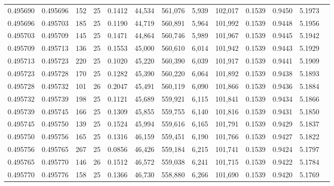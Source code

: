 \begin{tabular}{rrrrrrrrrrrrr}
0.495690 & 0.495696 & 152 &  25 &                                     0.1412 &  44,534 & 561,076 &   5,939 & 102,017 & 0.1539 & 0.9450 & 5.1973 \\
0.495696 & 0.495703 & 185 &  25 &                                     0.1190 &  44,719 & 560,891 &   5,964 & 101,992 & 0.1539 & 0.9448 & 5.1956 \\
0.495703 & 0.495709 & 145 &  25 &                                     0.1471 &  44,864 & 560,746 &   5,989 & 101,967 & 0.1539 & 0.9445 & 5.1942 \\
0.495709 & 0.495713 & 136 &  25 &                                     0.1553 &  45,000 & 560,610 &   6,014 & 101,942 & 0.1539 & 0.9443 & 5.1929 \\
0.495713 & 0.495723 & 220 &  25 &                                     0.1020 &  45,220 & 560,390 &   6,039 & 101,917 & 0.1539 & 0.9441 & 5.1909 \\
0.495723 & 0.495728 & 170 &  25 &                                     0.1282 &  45,390 & 560,220 &   6,064 & 101,892 & 0.1539 & 0.9438 & 5.1893 \\
0.495728 & 0.495732 & 101 &  26 &                                     0.2047 &  45,491 & 560,119 &   6,090 & 101,866 & 0.1539 & 0.9436 & 5.1884 \\
0.495732 & 0.495739 & 198 &  25 &                                     0.1121 &  45,689 & 559,921 &   6,115 & 101,841 & 0.1539 & 0.9434 & 5.1866 \\
0.495739 & 0.495745 & 166 &  25 &                                     0.1309 &  45,855 & 559,755 &   6,140 & 101,816 & 0.1539 & 0.9431 & 5.1850 \\
0.495745 & 0.495750 & 139 &  25 &                                     0.1524 &  45,994 & 559,616 &   6,165 & 101,791 & 0.1539 & 0.9429 & 5.1837 \\
0.495750 & 0.495756 & 165 &  25 &                                     0.1316 &  46,159 & 559,451 &   6,190 & 101,766 & 0.1539 & 0.9427 & 5.1822 \\
0.495756 & 0.495765 & 267 &  25 &                                     0.0856 &  46,426 & 559,184 &   6,215 & 101,741 & 0.1539 & 0.9424 & 5.1797 \\
0.495765 & 0.495770 & 146 &  26 &                                     0.1512 &  46,572 & 559,038 &   6,241 & 101,715 & 0.1539 & 0.9422 & 5.1784 \\
0.495770 & 0.495776 & 158 &  25 &                                     0.1366 &  46,730 & 558,880 &   6,266 & 101,690 & 0.1539 & 0.9420 & 5.1769 \\

\end{tabular}
